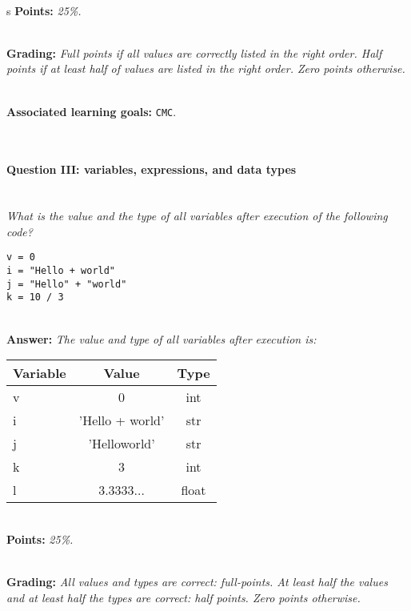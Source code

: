 \ \\
s
\textbf{Points:} \textit{25\%.}

\ \\ 

\textbf{Grading:} \textit{Full points if all values are correctly listed in the right order. Half points if at least half of values are listed in the right order. Zero points otherwise.}

\ \\ 

\textbf{Associated learning goals:} \texttt{CMC}.

\ \\ 

\paragraph{Question III: variables, expressions, and data types}

\ \\ 

\textit{What is the value and the type of all variables after execution of the following code?}
\begin{lstlisting}
v = 0
i = "Hello + world"
j = "Hello" + "world"
k = 10 / 3
\end{lstlisting}

\ \\ 

\textbf{Answer:} \textit{The value and type of all variables after execution is:}

\begin{tabular}{| l | c | c | }
\hline
\textbf{Variable} & \textbf{Value} & \textbf{Type} \\
\hline
v & 0 & int \\
\hline
i & 'Hello + world' & str \\
\hline
j & 'Helloworld' & str \\
\hline
k & 3 & int \\
\hline
l & 3.3333$\dots$ & float \\
\hline
\end{tabular}

\ \\ 

\textbf{Points:} \textit{25\%.}

\ \\ 

\textbf{Grading:} \textit{All values and types are correct: full-points. At least half the values and at least half the types are correct: half points. Zero points otherwise.}

